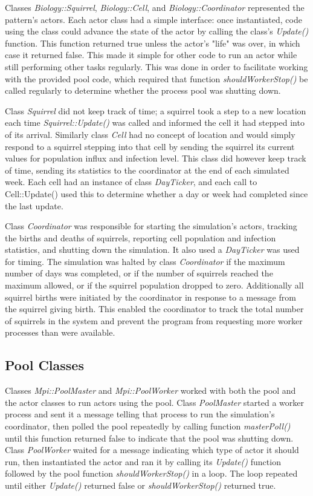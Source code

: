 \documentclass[11pt, oneside]{article}   %
\begin{document}
Classes {\em Biology::Squirrel}, {\em Biology::Cell}, and {\em Biology::Coordinator} represented the pattern's actors.
Each actor class had a simple interface: once instantiated, code using the class could advance the state of the actor by calling the class's {\em Update()} function.
This function returned true unless the actor's "life" was over, in which case it returned false.
This made it simple for other code to run an actor while still performing other tasks regularly.
This was done in order to facilitate working with the provided pool code, which required that function {\em shouldWorkerStop()} be called regularly to determine whether the process pool was shutting down.

Class {\em Squirrel} did not keep track of time; a squirrel took a step to a new location each time {\em Squirrel::Update()} was called and informed the cell it had stepped into of its arrival.
Similarly class {\em Cell} had no concept of location and would simply respond to a squirrel stepping into that cell by sending the squirrel its current values for population influx and infection level.
This class did however keep track of time, sending its statistics to the coordinator at the end of each simulated week.
Each cell had an instance of class {\em DayTicker}, and each call to {Cell::Update()} used this to determine whether a day or week had completed since the last update.

Class {\em Coordinator} was responsible for starting the simulation's actors, tracking the births and deaths of squirrels, reporting cell population and infection statistics, and shutting down the simulation.
It also used a {\em DayTicker} was used for timing.
The simulation was halted by class {\em Coordinator} if the maximum number of days was completed, or if the number of squirrels reached the maximum allowed, or if the squirrel population dropped to zero.
Additionally all squirrel births were initiated by the coordinator in response to a message from the squirrel giving birth. 
This enabled the coordinator to track the total number of squirrels in the system and prevent the program from requesting more worker processes than were available.

\subsection{Pool Classes}

Classes {\em Mpi::PoolMaster} and {\em Mpi::PoolWorker} worked with both the pool and the actor classes to run actors using the pool.
Class {\em PoolMaster} started a worker process and sent it a message telling that process to run the simulation's coordinator, then polled the pool repeatedly by calling function {\em masterPoll()} until this function returned false to indicate that the pool was shutting down.
Class {\em PoolWorker} waited for a message indicating which type of actor it should run, then instantiated the actor and ran it by calling its {\em Update()} function followed by the pool function {\em shouldWorkerStop()} in a loop. 
The loop repeated until either {\em Update()} returned false or {\em shouldWorkerStop()} returned true.
\end{document}

